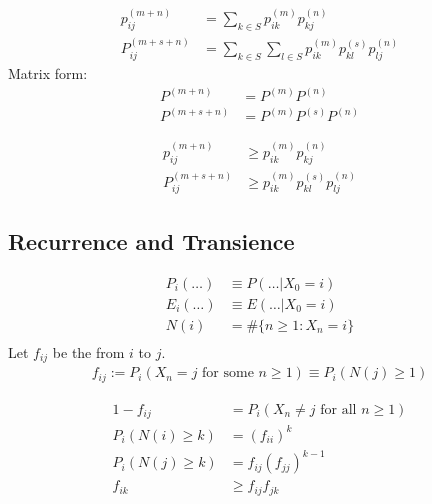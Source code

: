 \documentclass[11pt]{article}
\begin{document}
    

    
    \begin{align*}
    	p_{ij}^{(m+n)} &= \sum_{k \in S} p_{ik}^{(m)}p_{kj}^{(n)} \\
    	P_{ij}^{(m + s +n)} &= \sum_{k \in S}\sum_{l \in S} p_{ik}^{(m)} p_{kl}^{(s)}p_{lj}^{(n)}
    \end{align*}
    Matrix form:
	\begin{align*}
		P^{(m + n)} &= P^{(m)}P^{(n)} \\
		P^{(m + s +n)} &= P^{(m)}P^{(s)}P^{(n)}
	\end{align*}
    
    \begin{align*}
    	p_{ij}^{(m+n)} &\geq p_{ik}^{(m)}p_{kj}^{(n)} \tag{for all $k \in S$} \\
    	P_{ij}^{(m + s +n)} &\geq  p_{ik}^{(m)} p_{kl}^{(s)}p_{lj}^{(n)} \tag{for any $k, l \in S$}
    \end{align*}
    
    \subsection{Recurrence and Transience}
    \notation
    \begin{align*}
    	P_i(\hdots) &\equiv P(\hdots | X_0 = i) \\
    	E_i(\hdots) &\equiv E(\hdots | X_0 = i) \\
    	N(i) &= \#\{n \geq 1: X_n = i\} \tag{total number of times that the chain hits $i$, not counting time 0} \\
    \end{align*}
    Let $f_{ij}$ be the  from $i$ to $j$.
    \begin{align*}
    	 f_{ij} := P_i(X_n = j \text{ for some } n \geq 1) \equiv P_i(N(j) \geq 1)
    \end{align*}
    
    \fact
    \begin{align}
    	1 - f_{ij} &= P_i(X_n \neq j \text{ for all } n \geq 1) \\
    	P_i(N(i) \geq k) &= (f_{ii})^k \\
    	P_i(N(j) \geq k) &= f_{ij}(f_{jj})^{k-1} \\
    	f_{ik} &\geq f_{ij}f_{jk}
    \end{align}
    
\end{document}
